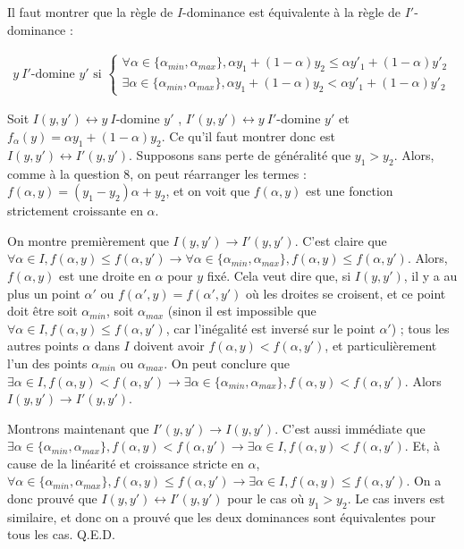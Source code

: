 \documentclass[paper=a4, fontsize=11pt]{scrartcl} %
\numberwithin{equation}{section} %
\numberwithin{figure}{section} %
\numberwithin{table}{section} %
\begin{document}
Il faut montrer que la r\`egle de $I$-dominance est \'equivalente \`a la r\`egle de $I'$-dominance :

\begin{align}
y\ I'\text{-domine }y'\text{ si } \begin{cases} \forall\alpha\in \{\alpha_{min}, \alpha_{max}\}, \alpha y_1 + (1-\alpha)y_2 \leq \alpha y'_1 + (1-\alpha)y'_2 \\
\exists\alpha\in \{\alpha_{min}, \alpha_{max}\}, \alpha y_1 + (1-\alpha)y_2 < \alpha y'_1 + (1-\alpha)y'_2 \end{cases}
\end{align}

Soit $I(y,y')\leftrightarrow y\ I$-domine $y'$ , $I'(y,y')\leftrightarrow y\ I'$-domine $y'$ et $f_{\alpha}(y) = \alpha y_1 + (1-\alpha)y_2$. Ce qu'il faut montrer donc est $I(y,y') \leftrightarrow I'(y,y')$. Supposons sans perte de g\'en\'eralit\'e que $y_1>y_2$. Alors, comme \`a la question 8, on peut r\'earranger les termes : $f(\alpha,y) = (y_1-y_2)\alpha  + y_2$, et on voit que $f(\alpha,y)$ est une fonction strictement croissante en $\alpha$.

On montre premi\`erement que $I(y,y')\rightarrow I'(y,y')$. C'est claire que $\forall\alpha\in I, f(\alpha,y) \leq f(\alpha,y')\rightarrow \forall\alpha\in \{\alpha_{min}, \alpha_{max}\}, f(\alpha,y) \leq f(\alpha,y')$. Alors,$f(\alpha,y)$ est une droite en $\alpha$ pour $y$ fix\'e. Cela veut dire que, si $I(y,y')$, il y a au plus un point $\alpha'$ ou $f(\alpha',y) = f(\alpha',y')$ o\`u les droites se croisent, et ce point doit \^etre soit $\alpha_{min}$, soit $\alpha_{max}$ (sinon il est impossible que $\forall\alpha\in I, f(\alpha,y)\leq f(\alpha,y')$, car l'in\'egalit\'e est invers\'e sur le point $\alpha'$) ; tous les autres points $\alpha$ dans $I$ doivent avoir $f(\alpha,y)<f(\alpha,y')$, et particuli\`erement l'un des points $\alpha_{min}$ ou $\alpha_{max}$. On peut conclure que $\exists\alpha\in I, f(\alpha,y) < f(\alpha,y')\rightarrow\exists\alpha\in \{\alpha_{min}, \alpha_{max}\}, f(\alpha,y)<f(\alpha,y')$. Alors $I(y,y')\rightarrow I'(y,y')$.

Montrons maintenant que $I'(y,y')\rightarrow I(y,y')$. C'est aussi imm\'ediate que $\exists\alpha\in \{\alpha_{min}, \alpha_{max}\}, f(\alpha,y) < f(\alpha,y')\rightarrow\exists\alpha\in I, f(\alpha,y)<f(\alpha,y')$. Et, \`a cause de la lin\'earit\'e et croissance stricte en $\alpha$, $\forall\alpha\in \{\alpha_{min}, \alpha_{max}\}, f(\alpha,y) \leq f(\alpha,y')\rightarrow\exists\alpha\in I, f(\alpha,y)\leq f(\alpha,y')$. On a donc prouv\'e que $I(y,y')\leftrightarrow I'(y,y')$ pour le cas o\`u $y_1>y_2$. Le cas invers est similaire, et donc on a prouv\'e que les deux dominances sont \'equivalentes pour tous les cas. Q.E.D.
\end{document}
